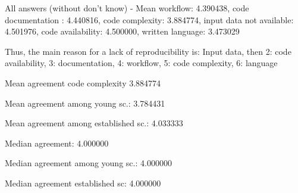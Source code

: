 
All answers (without don't know) -  Mean workflow: 4.390438, code documentation : 4.440816, code complexity: 3.884774, input data not available: 4.501976, code availability: 4.500000, written language: 3.473029

Thus, the main reason for a lack of reproducibility is: Input data, then 2: code availability, 3: documentation, 4: workflow, 5: code complexity, 6: language

Mean agreement code complexity 3.884774

Mean agreement among young sc.: 3.784431

Mean agreement among established sc.: 4.033333

Median agreement: 4.000000

Median agreement among young sc.: 4.000000

Median agreement established sc: 4.000000
